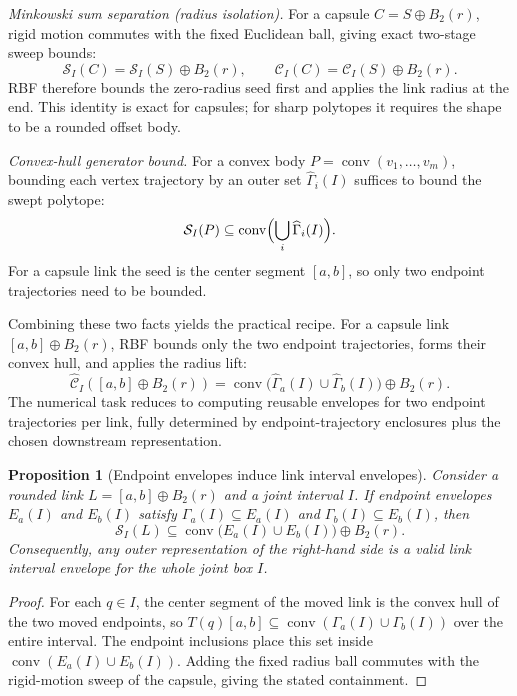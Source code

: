 \documentclass[journal]{IEEEtran}
\DeclareRobustCommand{\textsc}[1]{\textnormal{\MakeUppercase{#1}}}
\newtheorem{proposition}{Proposition}
\newcommand{\rbf}{\textsc{RBF}}
\begin{document}
\emph{Minkowski sum separation (radius isolation).}
For a capsule $C = S \oplus B_2(r)$, rigid motion commutes with the fixed
Euclidean ball, giving exact two-stage sweep bounds:
\[
\mathcal{S}_I(C) = \mathcal{S}_I(S) \oplus B_2(r),
\qquad
\mathcal{C}_I(C) = \mathcal{C}_I(S) \oplus B_2(r).
\]
\rbf{} therefore bounds the zero-radius seed first and applies the link radius
at the end. This identity is exact for capsules; for sharp polytopes it requires
the shape to be a rounded offset body.

\emph{Convex-hull generator bound.}
For a convex body $P = \operatorname{conv}(v_1,\dots,v_m)$, bounding each
vertex trajectory by an outer set $\widehat{\Gamma}_i(I)$ suffices to bound
the swept polytope:
\[
\mathcal{S}_I(P) \subseteq \operatorname{conv}\Bigl(\bigcup_i
\widehat{\Gamma}_i(I)\Bigr).
\]
For a capsule link the seed is the center segment $[a,b]$, so only two
endpoint trajectories need to be bounded.

Combining these two facts yields the practical recipe. For a capsule link
$[a,b] \oplus B_2(r)$, \rbf{} bounds only the two endpoint trajectories, forms
their convex hull, and applies the radius lift:
\[
\widehat{\mathcal{C}}_I([a,b] \oplus B_2(r))
= \operatorname{conv}\bigl(\widehat{\Gamma}_a(I) \cup
\widehat{\Gamma}_b(I)\bigr) \oplus B_2(r).
\]
The numerical task reduces to computing reusable envelopes for two endpoint
trajectories per link, fully determined by endpoint-trajectory enclosures plus
the chosen downstream representation.

\begin{proposition}[Endpoint envelopes induce link interval envelopes]
\label{prop:endpoint_to_link_envelope}
Consider a rounded link $L=[a,b]\oplus B_2(r)$ and a joint interval $I$. If
endpoint envelopes $E_a(I)$ and $E_b(I)$ satisfy
$\Gamma_a(I)\subseteq E_a(I)$ and $\Gamma_b(I)\subseteq E_b(I)$, then
\[
\mathcal{S}_I(L)
\subseteq
\operatorname{conv}\bigl(E_a(I)\cup E_b(I)\bigr)\oplus B_2(r).
\]
Consequently, any outer representation of the right-hand side is a valid link
interval envelope for the whole joint box $I$.
\end{proposition}

\begin{proof}
For each $q\in I$, the center segment of the moved link is the convex hull of
the two moved endpoints, so
$T(q)[a,b]\subseteq\operatorname{conv}(\Gamma_a(I)\cup\Gamma_b(I))$ over the
entire interval. The endpoint inclusions place this set inside
$\operatorname{conv}(E_a(I)\cup E_b(I))$. Adding the fixed radius ball commutes
with the rigid-motion sweep of the capsule, giving the stated containment.
\end{proof}
\end{document}
